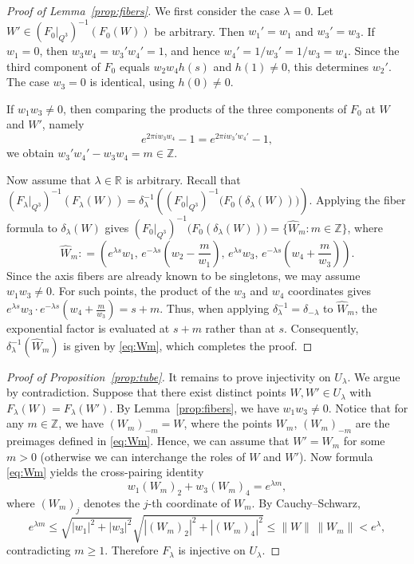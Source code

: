 \documentclass[11pt,a4paper,reqno]{amsart}
\begin{document}
\begin{proof}[Proof of Lemma~\ref{prop:fibers}]
We first consider the case $\lambda=0$. Let $W'\in (F_0|_{Q^3})^{-1}(F_0(W))$ be arbitrary. Then $w_1'=w_1$ and $w_3'=w_3$. If $w_1=0$, then $w_3w_4=w_3'w_4'=1$, and hence $w_4'=1/w_3'=1/w_3=w_4$. Since the third component of $F_0$ equals $w_2 w_4 h(s)$ and $h(1)\neq0$, this determines $w_2'$. The case $w_3=0$ is identical, using $h(0)\neq0$.

If $w_1w_3\neq0$, then comparing the products of the three components of $F_0$ at $W$ and $W'$, namely 
\begin{equation*}%
e^{2\pi iw_3w_4}-1=e^{2\pi iw_3'w_4'}-1,
\end{equation*}
we obtain $w_3'w_4'-w_3w_4=m\in\mathbb Z$. 

Now assume that $\lambda\in\mathbb R$ is arbitrary. Recall that $(F_{\lambda}|_{Q^3})^{-1}(F_{\lambda}(W))=\delta_{\lambda}^{-1}\left( (F_0|_{Q^3})^{-1}\bigl(F_0(\delta_{\lambda}(W))\bigr)\right)$. Applying the fiber formula to $\delta_{\lambda}(W)$ gives
$(F_0|_{Q^3})^{-1}\bigl(F_0(\delta_{\lambda}(W))\bigr) = \{\widehat W_m:m\in\mathbb Z\}$,
where
\[
 \widehat W_m:
 =
 \left(
 e^{\lambda s}w_1,\,
 e^{-\lambda s}(w_2-\frac{m}{w_1}),\,
 e^{\lambda s}w_3,\,
 e^{-\lambda s}(w_4+\frac{m}{w_3})
 \right).
\]
Since the axis fibers are already known to be singletons, we may assume \(w_1w_3\neq0\). For such points, the product of the $w_3$ and $w_4$ coordinates gives $e^{\lambda s}w_3\cdot e^{-\lambda s}(w_4+\frac{m}{w_3})=s+m$. Thus, when applying \(\delta_{\lambda}^{-1}=\delta_{-\lambda}\) to \(\widehat W_m\), the exponential factor is evaluated at \(s+m\) rather than at \(s\). Consequently, \(\delta_{\lambda}^{-1}(\widehat W_m)\) is given by \eqref{eq:Wm}, which completes the proof.
\end{proof}

\begin{proof}[Proof of Proposition~\ref{prop:tube}]
It remains to prove injectivity on $U_{\lambda}$. We argue by contradiction. Suppose that there exist distinct points $W,W'\in U_{\lambda}$ with $F_{\lambda}(W)=F_{\lambda}(W')$. By Lemma~\ref{prop:fibers}, we have $w_1w_3\neq0$. Notice that for any $m\in\mathbb Z$, we have $(W_m)_{-m}=W$, where
the points $W_m$, $(W_m)_{-m}$ are the preimages defined in \eqref{eq:Wm}.  Hence, we can assume that $W'=W_m$ for some $m>0$ (otherwise we can interchange the roles of $W$ and $W'$). Now formula \eqref{eq:Wm} yields the cross-pairing identity
\begin{equation*}
w_1(W_m)_2+w_3(W_m)_4=e^{\lambda m},
\end{equation*}
where $(W_m)_j$ denotes the 
$j$-th coordinate of $W_m$. By Cauchy--Schwarz,
\begin{equation*}
 e^{\lambda m}\leq \sqrt{|w_1|^2+|w_3|^2}          \sqrt{|(W_m)_2|^2+|(W_m)_4|^2}\leq \|W\|\,\|W_m\|<e^{\lambda},    
\end{equation*}
contradicting $m\geq1$.
Therefore $F_{\lambda}$ is injective on $U_{\lambda}$.
\end{proof}





 

\end{document}
